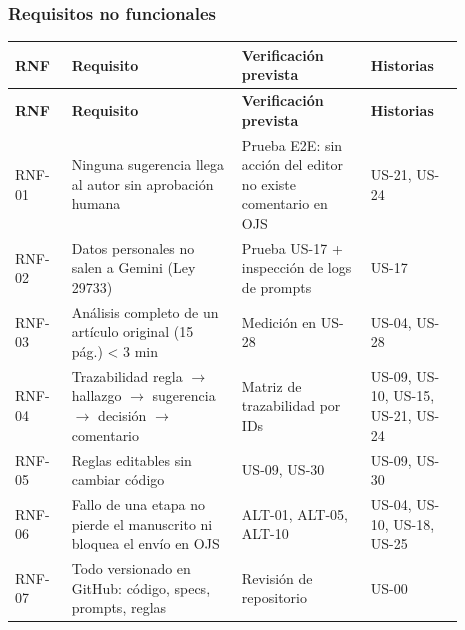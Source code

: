 \subsubsection*{Requisitos no funcionales}

{\small
\begin{longtable}{@{}>{\raggedright\arraybackslash}p{0.118\linewidth}>{\raggedright\arraybackslash}p{0.338\linewidth}>{\raggedright\arraybackslash}p{0.257\linewidth}>{\raggedright\arraybackslash}p{0.181\linewidth}@{}}
\toprule
\textbf{RNF} & \textbf{Requisito} & \textbf{Verificación prevista} & \textbf{Historias} \\
\midrule
\endfirsthead
\toprule
\textbf{RNF} & \textbf{Requisito} & \textbf{Verificación prevista} & \textbf{Historias} \\
\midrule
\endhead
\bottomrule
\endfoot
\endlastfoot
RNF-01 & Ninguna sugerencia llega al autor sin aprobación humana & Prueba E2E: sin acción del editor no existe comentario en OJS & US-21, US-24 \\
RNF-02 & Datos personales no salen a Gemini (Ley 29733) & Prueba US-17 + inspección de logs de prompts & US-17 \\
RNF-03 & Análisis completo de un artículo original (15 pág.) < 3 min & Medición en US-28 & US-04, US-28 \\
RNF-04 & Trazabilidad regla $\rightarrow$ hallazgo $\rightarrow$ sugerencia $\rightarrow$ decisión $\rightarrow$ comentario & Matriz de trazabilidad por IDs & US-09, US-10, US-15, US-21, US-24 \\
RNF-05 & Reglas editables sin cambiar código & US-09, US-30 & US-09, US-30 \\
RNF-06 & Fallo de una etapa no pierde el manuscrito ni bloquea el envío en OJS & ALT-01, ALT-05, ALT-10 & US-04, US-10, US-18, US-25 \\
RNF-07 & Todo versionado en GitHub: código, specs, prompts, reglas & Revisión de repositorio & US-00 \\
\end{longtable}
}
